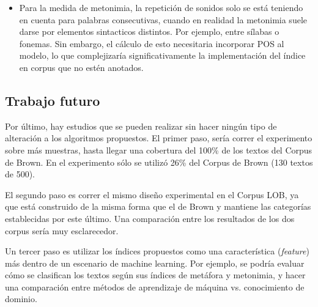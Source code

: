 \documentclass[12pt,letterpaper,twoside]{article}
\begin{document}
\begin{itemize}
\item Para la medida de metonimia, la repetición de sonidos solo se está
teniendo en cuenta para palabras consecutivas, cuando en realidad la
metonimia suele darse por elementos sintacticos distintos. Por
ejemplo, entre sílabas o fonemas. Sin embargo, el cálculo de esto
necesitaria incorporar POS al modelo, lo que complejizaría
significativamente la implementación del índice en corpus que no
estén anotados.
\end{itemize}


\subsection{Trabajo futuro}
\label{sec:org9dd553d}

Por último, hay estudios que se pueden realizar sin hacer ningún
tipo de alteración a los algoritmos propuestos. El primer paso,
sería correr el experimento sobre más muestras, hasta llegar una
cobertura del 100\% de los textos del Corpus de Brown. En el
experimento sólo se utilizó 26\% del Corpus de Brown (130 textos de
500).

El segundo paso es correr el mismo diseño experimental en el
Corpus LOB, ya que está construido de la misma forma que el de
Brown y mantiene las categorías establecidas por este último. Una
comparación entre los resultados de los dos corpus sería muy
esclarecedor.

Un tercer paso es utilizar los índices propuestos como una
característica (\emph{feature}) más dentro de un escenario de machine
learning. Por ejemplo, se podría evaluar cómo se clasifican los
textos según sus índices de metáfora y metonimia, y hacer
una comparación entre métodos de aprendizaje de máquina vs.
conocimiento de dominio. 




 
\nocite{*}
\end{document}
